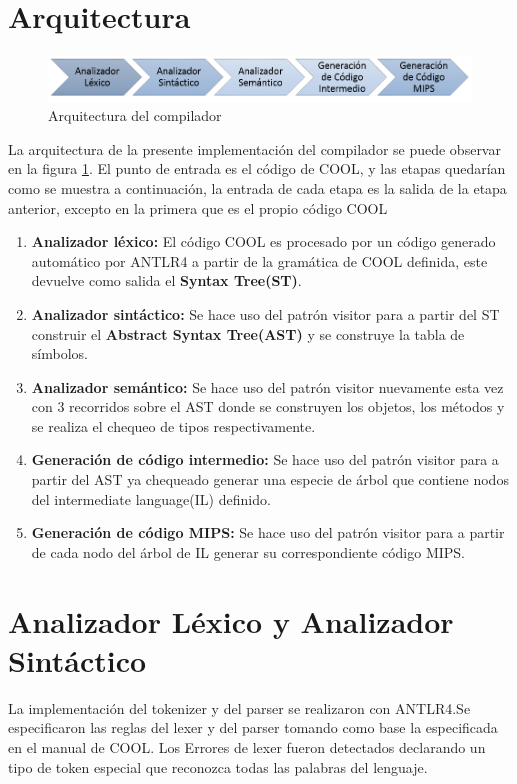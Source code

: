 \documentclass[12pt,a4paper]{article}
\begin{document}
	\section{Arquitectura}
		\begin{figure}[H]
			\centering
			\includegraphics[scale=0.5]{Informe/Arquitectura.png}
			\caption{Arquitectura del compilador}
			\label{arch}
		\end{figure}
		La arquitectura de la presente implementación del compilador se puede observar en la figura \ref{arch}. El punto de entrada es el código de COOL, y las etapas quedarían como se muestra a continuación, la entrada de cada etapa es la salida de la etapa anterior, excepto en la primera que es el propio código COOL
		\begin{enumerate}
			\item \textbf{Analizador léxico:} El código COOL es procesado por un código generado automático por ANTLR4 a partir de la gramática de COOL definida, este devuelve como salida el \textbf{Syntax Tree(ST)}.
			\item \textbf{Analizador sintáctico:} Se hace uso del patrón visitor para a partir del ST construir el \textbf{Abstract Syntax Tree(AST)} y se construye la tabla de símbolos.
			\item \textbf{Analizador semántico:} Se hace uso del patrón visitor nuevamente esta vez con 3 recorridos sobre el AST donde se construyen los objetos, los métodos y se realiza el chequeo de tipos respectivamente.
			\item \textbf{Generación de código intermedio:} Se hace uso del patrón visitor para a partir del AST ya chequeado generar una especie de árbol que contiene nodos del intermediate language(IL) definido.
			\item  \textbf{Generación de código MIPS:} Se hace uso del patrón visitor para a partir de cada nodo del árbol de IL generar su correspondiente código MIPS.
		\end{enumerate}
		 
	\section{Analizador Léxico y Analizador Sintáctico}
		La implementación del tokenizer y del parser se realizaron con ANTLR4.Se especificaron las reglas del lexer y del parser tomando como base la especificada en el manual de COOL. Los Errores de lexer fueron detectados declarando un tipo de token especial que reconozca todas las palabras del lenguaje.
		
\end{document}

